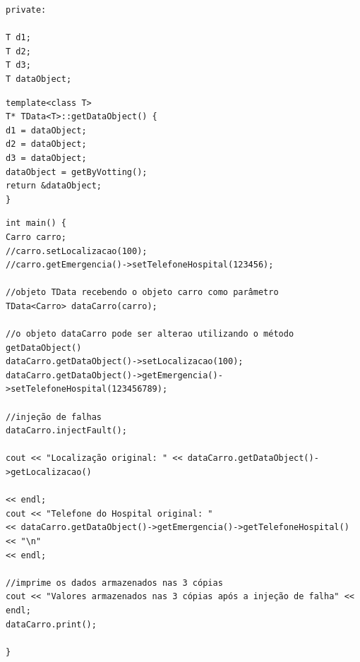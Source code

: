 \begin{lstlisting}[label=Func:TDataDataObject,caption={[Objetos que representam a redundância de dados da classe TData]Os objetos d1, d2 e d3 são utilizados para a redundância de dados e o objeto \textit{dataObject} é utilizadado para atulizar os valores de todas as cópias.}]
private:

T d1;
T d2;
T d3;
T dataObject;
\end{lstlisting}

\begin{lstlisting}[label=Func:TDataGetDataObject,caption={[Método responsável pela redundância de dados.] Método reponsável pela atualização de todas cópias da classe \textit{TData}.}]
template<class T>
T* TData<T>::getDataObject() {
d1 = dataObject;
d2 = dataObject;
d3 = dataObject;
dataObject = getByVotting();
return &dataObject;
}
\end{lstlisting}

\begin{lstlisting}[label=Func:TDataGetDataObjectSaida,caption={[Teste realizado verificar a integridade dos dados de localização do carro] O objeto carro foi instanciado com os valores iniciais declarados no seu construtor \autoref{Func:CarroPonteiro} e foi passado como parâmetro no objeto \textit{TData}. Ao acessar o método \textit{getDataObject} obtém-se como retorno uma referência para o objeto \textit{dataObject} permitindo que se possa alterar os valores de seus atributos e atualizar as cópias com os novos dados.}]
int main() {
Carro carro;
//carro.setLocalizacao(100);
//carro.getEmergencia()->setTelefoneHospital(123456);

//objeto TData recebendo o objeto carro como parâmetro
TData<Carro> dataCarro(carro);

//o objeto dataCarro pode ser alterao utilizando o método getDataObject()
dataCarro.getDataObject()->setLocalizacao(100);
dataCarro.getDataObject()->getEmergencia()->setTelefoneHospital(123456789);

//injeção de falhas
dataCarro.injectFault();

cout << "Localização original: " << dataCarro.getDataObject()->getLocalizacao()

<< endl;
cout << "Telefone do Hospital original: "
<< dataCarro.getDataObject()->getEmergencia()->getTelefoneHospital() << "\n"
<< endl;

//imprime os dados armazenados nas 3 cópias
cout << "Valores armazenados nas 3 cópias após a injeção de falha" << endl;
dataCarro.print();

}
\end{lstlisting}

